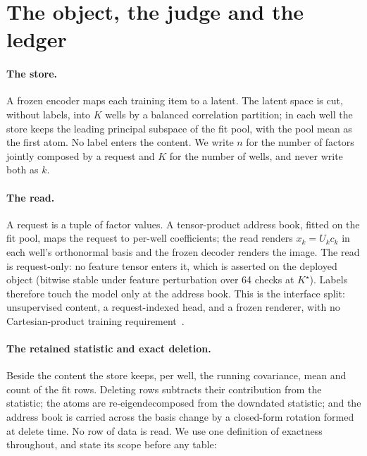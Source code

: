 \documentclass{article} %
\newcommand{\Kstar}{\ensuremath{K^{\star}}}
\begin{document}
\section{The object, the judge and the ledger}
\label{sec:object}

\paragraph{The store.} A frozen encoder maps each training item to a latent. The latent
space is cut, without labels, into $K$ wells by a balanced correlation partition; in each well
the store keeps the leading principal subspace of the fit pool, with the pool mean as the
first atom. No label enters the content. We write $n$ for the number of factors jointly
composed by a request and $K$ for the number of wells, and never write both as $k$.

\paragraph{The read.} A request is a tuple of factor values. A tensor-product address book,
fitted on the fit pool, maps the request to per-well coefficients; the read renders
$x_k=U_k c_k$ in each well's orthonormal basis and the frozen decoder renders the image. The
read is request-only: no feature tensor enters it, which is asserted on the deployed object
(bitwise stable under feature perturbation over 64 checks at $\Kstar$).
Labels therefore touch the model only at the address book. This is the interface split:
unsupervised content, a request-indexed head, and a frozen renderer, with no Cartesian-product
training requirement~\citep{wiedemer2023compositional,lachapelle2023additive,montero2022lost}.

\paragraph{The retained statistic and exact deletion.} Beside the content the store keeps, per
well, the running covariance, mean and count of the fit rows. Deleting rows subtracts their
contribution from the statistic; the atoms are re-eigendecomposed from the downdated
statistic; and the address book is carried across the basis change by a closed-form rotation
formed at delete time. No row of data is read. We use one definition of exactness throughout,
and state its scope before any table:
\end{document}
